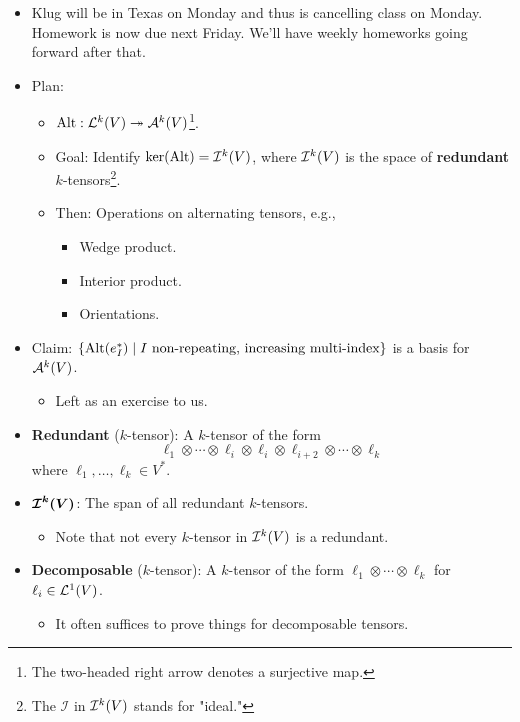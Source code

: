 \documentclass[../notes.tex]{subfiles}
\begin{document}
\begin{itemize}
    \item {}Klug will be in Texas on Monday and thus is cancelling class on Monday. Homework is now due next Friday. We'll have weekly homeworks going forward after that.
    \item Plan:
    \begin{itemize}
        \item $\Alt:\lin[k]{V}\twoheadrightarrow\alt[k]{V}$\footnote{The two-headed right arrow denotes a surjective map.}.
        \item Goal: Identify $\ker(\Alt)=\ide[k]{V}$, where $\ide[k]{V}$ is the space of \textbf{redundant} $k$-tensors\footnote{The $\mathcal{I}$ in $\ide[k]{V}$ stands for "ideal."}.
        \item Then: Operations on alternating tensors, e.g.,
        \begin{itemize}
            \item Wedge product.
            \item Interior product.
            \item Orientations.
        \end{itemize}
    \end{itemize}
    \item Claim: $\{\Alt(e_I^*)\mid I\text{ non-repeating, increasing multi-index}\}$ is a basis for $\alt[k]{V}$.
    \begin{itemize}
        \item Left as an exercise to us.
    \end{itemize}
    \item \textbf{Redundant} ($k$-tensor): A $k$-tensor of the form
    \begin{equation*}
        \ell_1\otimes\cdots\otimes\ell_i\otimes\ell_i\otimes\ell_{i+2}\otimes\cdots\otimes\ell_k
    \end{equation*}
    where $\ell_1,\dots,\ell_k\in V^*$.
    \item $\bm{\ide[k]{V}}$: The span of all redundant $k$-tensors.
    \begin{itemize}
        \item Note that not every $k$-tensor in $\ide[k]{V}$ is a redundant.
    \end{itemize}
    \item \textbf{Decomposable} ($k$-tensor): A $k$-tensor of the form $\ell_1\otimes\cdots\otimes\ell_k$ for $\ell_i\in\lin[1]{V}$.
    \begin{itemize}
        \item It often suffices to prove things for decomposable tensors.

\end{itemize}
\end{itemize}
\end{document}
